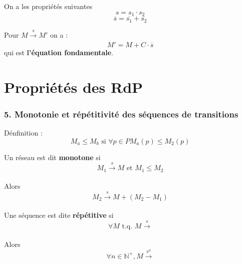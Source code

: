 \documentclass[12pt,a4paper,oneside]{article}
\begin{document}
		On a les propriétés suivantes
		$$s = s_1 \cdot s_2$$
		$$\overline{s} = \overline{s_1} + \overline{s_2}$$

		Pour $M \xrightarrow[]{s} M'$ on a :
		$$M' = M + C \cdot \overline{s}$$
	 	qui est \textbf{l'équation fondamentale}.

\section{Propriétés des RdP}
	\subsubsection*{5. Monotonie et répétitivité des séquences de transitions}

		Dénfinition :
		$$M_a \leq M_b \textrm{ si } \forall p \in P M_a(p) \leq M_2(p)$$

		Un réseau est dit \textbf{monotone} si
		$$M_1 \xrightarrow[]{s} M \textrm{ et } M_1 \leq M_2$$

		Alors
		$$M_2 \xrightarrow[]{s} M + (M_2 - M_1)$$

		Une séquence est dite \textbf{répétitive} si
		$$\forall M \textrm{ t.q. } M \xrightarrow[]{s}$$

		Alors
		$$\forall n \in \mathbb{N^+}, M \xrightarrow[]{s^n}$$
\end{document}
